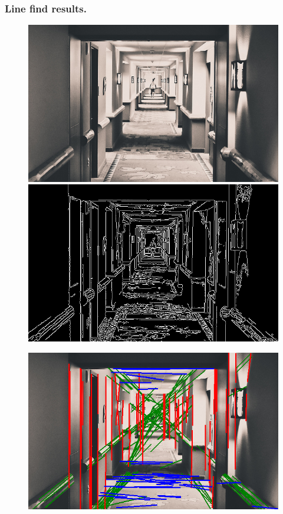 \documentclass{beamer}
\begin{document}
\begin{frame}
\frametitle{Line find results.}
 \begin{figure}
     \includegraphics[width=0.4\linewidth]{hallway.jpg}
     \quad
     \includegraphics[width=0.4\linewidth]{hallwayedges.png}
 \end{figure}
 \begin{figure}
     \includegraphics[width=0.4\linewidth]{hallwaylines.png}
 \end{figure}
\end{frame}
\end{document}
